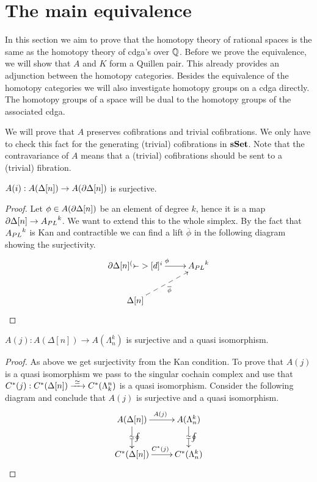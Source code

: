 
\chapter{The main equivalence}

In this section we aim to prove that the homotopy theory of rational spaces is the same as the homotopy theory of cdga's over $\mathbb{Q}$. Before we prove the equivalence, we will show that $A$ and $K$ form a Quillen pair. This already provides an adjunction between the homotopy categories. Besides the equivalence of the homotopy categories we will also investigate homotopy groups on a cdga directly. The homotopy groups of a space will be dual to the homotopy groups of the associated cdga.

We will prove that $A$ preserves cofibrations and trivial cofibrations. We only have to check this fact for the generating (trivial) cofibrations in $\mathbf{s{\mathbf{Set}}}$. Note that the contravariance of $A$ means that a (trivial) cofibrations should be sent to a (trivial) fibration.

\begin{lemma}
	$A(i) : A(\Delta[n]) \to A(\partial \Delta[n])$ is surjective.
\end{lemma}
\begin{proof}
	Let $\phi \in A(\partial \Delta[n])$ be an element of degree $k$, hence it is a map $\partial \Delta[n] \to {A_{PL}}^k$. We want to extend this to the whole simplex. By the fact that ${A_{PL}}^k$ is Kan and contractible we can find a lift $\overline{\phi}$ in the following diagram showing the surjectivity.
	\begin{displaymath}
		\xymatrix {
		\del \Delta[n] \ar[r]^\phi \arcof[d]^i & \Apl^k \\
		\Delta[n] \ar@{-->}[ru]_{\overline{\phi}}
		}
	\end{displaymath}
\end{proof}

\begin{lemma}
	$A(j) : A(\Delta[n]) \to A(\Lambda^k_n)$ is surjective and a quasi isomorphism.
\end{lemma}
\begin{proof}
	As above we get surjectivity from the Kan condition. To prove that $A(j)$ is a quasi isomorphism we pass to the singular cochain complex and use that $C^\ast(j) : C^\ast(\Delta[n]) \xrightarrow{\,\,{\simeq}\,\,} C^\ast(\Lambda^n_k)$ is a quasi isomorphism. Consider the following diagram and conclude that $A(j)$ is surjective and a quasi isomorphism.
	\begin{displaymath}
		\xymatrix {
		A(\Delta[n]) \ar[r]^{A(j)} \arwe[d]^\oint & A(\Lambda^k_n) \arwe[d]^\oint \\
		C^\ast(\Delta[n]) \ar[r]^{C^\ast(j)} & C^\ast(\Lambda^k_n)
		}
	\end{displaymath}
\end{proof}

